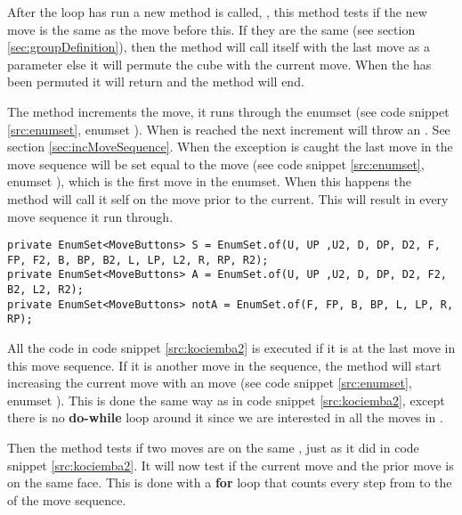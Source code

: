 After the loop has run a new method is called, , this method tests if the new move is the same as the move before this.
If they are the same (see section \ref{sec:groupDefinition}), then the method will call itself with the last move as a parameter else it will permute the cube with the current move.
When the \rubik{} has been permuted it will return and the method will end.

The method increments the move, it runs through the enumset  (see code snippet \ref{src:enumset}, enumset ). 
When  is reached the next increment will throw an . See section \ref{sec:incMoveSequence}.
When the exception is caught the last move in the move sequence will be set equal to the move (see code snippet \ref{src:enumset}, enumset ), which is the first move in the enumset.
When this happens the method will call it self on the move prior to the current. This will result in every move sequence it run through. 



\begin{lstlisting}[style=sourceCode, caption=\myCaption{The definition of the enumsets S, A, and notA.}, label=src:enumset]
private EnumSet<MoveButtons> S = EnumSet.of(U, UP ,U2, D, DP, D2, F, FP, F2, B, BP, B2, L, LP, L2, R, RP, R2);
private EnumSet<MoveButtons> A = EnumSet.of(U, UP ,U2, D, DP, D2, F2, B2, L2, R2);
private EnumSet<MoveButtons> notA = EnumSet.of(F, FP, B, BP, L, LP, R, RP);
\end{lstlisting}

All the code in code snippet \ref{src:kociemba2}  is executed if it is at the last move in this move sequence.
If it is another move in the sequence, the method will start increasing the current move with an  move (see code snippet \ref{src:enumset}, enumset ).
This is done the same way as in code snippet \ref{src:kociemba2}, except there is no \textbf{do-while} loop around it since we are interested in all the moves in .

Then the method tests if two moves are on the same \face{}, just as it did in code snippet \ref{src:kociemba2}.
It will now test if the current move and the prior move is on the same face.
This is done with a \textbf{for} loop that counts every step from  to the  of the move sequence.

